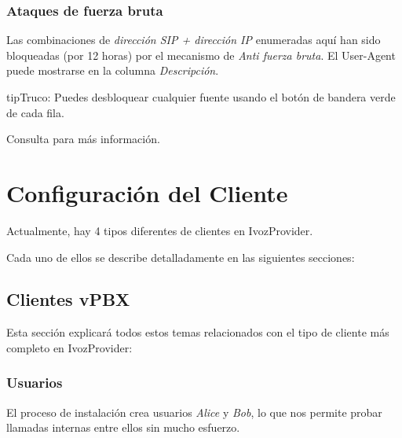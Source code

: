 \documentclass[letterpaper,10pt,spanish]{sphinxmanual}
\begin{document}
\subsection{Ataques de fuerza bruta}
\label{administration_portal/brand/views/bruteforce_attacks::doc}\label{administration_portal/brand/views/bruteforce_attacks:brute-force-attacks}\label{administration_portal/brand/views/bruteforce_attacks:id1}
Las combinaciones de \emph{dirección SIP + dirección IP} enumeradas aquí han sido bloqueadas (por 12 horas) por el mecanismo de \emph{Anti fuerza bruta}. El User-Agent puede mostrarse en la columna \emph{Descripción}.

\begin{notice}{tip}{Truco:}
Puedes desbloquear cualquier fuente usando el botón de bandera verde de cada fila.
\end{notice}

Consulta {\hyperref[security_and_maintenance/security/antibruteforce:anti\string-brute\string-force\string-attacks]{}} para más información.


\chapter{Configuración del Cliente}
\label{administration_portal/client/index:client-configuration}\label{administration_portal/client/index::doc}
Actualmente, hay 4 tipos diferentes de clientes en IvozProvider.

Cada uno de ellos se describe detalladamente en las siguientes secciones:
\label{administration_portal/client/vpbx/index:vpbx-clients}

\section{Clientes vPBX}
\label{administration_portal/client/vpbx/index:vpbx-clients}\label{administration_portal/client/vpbx/index:clientes-vpbx}\label{administration_portal/client/vpbx/index::doc}\label{administration_portal/client/vpbx/index:id1}
Esta sección explicará todos estos temas relacionados con el tipo de cliente más completo en IvozProvider:


\subsection{Usuarios}
\label{administration_portal/client/vpbx/users::doc}\label{administration_portal/client/vpbx/users:users}\label{administration_portal/client/vpbx/users:id1}
El proceso de instalación crea usuarios \emph{Alice} y \emph{Bob}, lo que nos permite probar llamadas internas entre ellos sin mucho esfuerzo.
\end{document}
